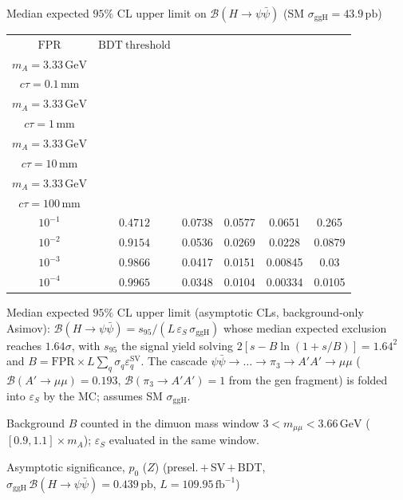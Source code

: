 \documentclass[10pt,a4paper]{article}
\begin{document}
{\vspace{12pt}

Median expected $95\%$ CL upper limit on $\mathcal{B}(H\to\psi\bar{\psi})$ (SM $\sigma_{\mathrm{ggH}}=43.9\,\mathrm{pb}$)

\begin{tabular}{cccccc}
\toprule
$\mathrm{FPR}$ & $\mathrm{BDT\ threshold}$ & \shortstack{$m_{\pi}=10\,\mathrm{GeV}$\\$m_{A}=3.33\,\mathrm{GeV}$\\$c\tau=0.1\,\mathrm{mm}$} & \shortstack{$m_{\pi}=10\,\mathrm{GeV}$\\$m_{A}=3.33\,\mathrm{GeV}$\\$c\tau=1\,\mathrm{mm}$} & \shortstack{$m_{\pi}=10\,\mathrm{GeV}$\\$m_{A}=3.33\,\mathrm{GeV}$\\$c\tau=10\,\mathrm{mm}$} & \shortstack{$m_{\pi}=10\,\mathrm{GeV}$\\$m_{A}=3.33\,\mathrm{GeV}$\\$c\tau=100\,\mathrm{mm}$} \\
\midrule
$10^{-1}$ & $0.4712$ & 0.0738 & 0.0577 & 0.0651 & 0.265\\
$10^{-2}$ & $0.9154$ & 0.0536 & 0.0269 & 0.0228 & 0.0879\\
$10^{-3}$ & $0.9866$ & 0.0417 & 0.0151 & 0.00845 & 0.03\\
$10^{-4}$ & $0.9965$ & 0.0348 & 0.0104 & 0.00334 & 0.0105\\
\bottomrule
\end{tabular}

{\small Median expected $95\%$ CL upper limit (asymptotic CLs, background-only Asimov): $\mathcal{B}(H\to\psi\bar{\psi})=s_{95}/(L\,\varepsilon_S\,\sigma_{\mathrm{ggH}})$ whose median expected exclusion reaches $1.64\sigma$, with $s_{95}$ the signal yield solving $2[s-B\ln(1{+}s/B)]=1.64^2$ and $B=\mathrm{FPR}\times L\sum_q\sigma_q\varepsilon_q^{\mathrm{SV}}$. The cascade $\psi\bar{\psi}\to\ldots\to\pi_3\to A'A'\to\mu\mu$ ($\mathcal{B}(A'\to\mu\mu)=0.193$, $\mathcal{B}(\pi_3\to A'A')=1$ from the gen fragment) is folded into $\varepsilon_S$ by the MC; assumes SM $\sigma_{\mathrm{ggH}}$.}

{\small Background $B$ counted in the dimuon mass window $3<m_{\mu\mu}<3.66\,\mathrm{GeV}$ ($[0.9,1.1]\times m_A$); $\varepsilon_S$ evaluated in the same window.}

\vspace{12pt}

Asymptotic significance, $p_0$ ($Z$) (presel.\,$+$\,SV\,$+$\,BDT, $\sigma_{\mathrm{ggH}}\,\mathcal{B}(H\to\psi\bar{\psi})=0.439\,\mathrm{pb}$, $L=109.95\,\mathrm{fb}^{-1}$)

}
\end{document}
